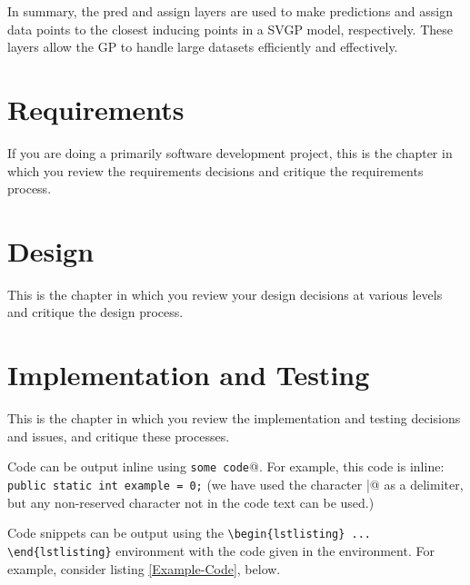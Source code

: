\documentclass[12pt,a4paper]{report}
\begin{document}
In summary, the pred and assign layers are used to make predictions and assign data points to the closest inducing points in a SVGP model, respectively. These layers allow the GP to handle large datasets efficiently and effectively.


\chapter{Requirements}

If you are doing a primarily software development project, this is the chapter in which you review the requirements decisions and critique the requirements process.

\chapter{Design}

This is the chapter in which you review your design decisions at various
levels and critique the design process.

\chapter{Implementation and Testing}

This is the chapter in which you review the implementation and testing decisions and issues, and critique these processes.

Code can be output inline using \verb@\lstinline|some code|@.  For example, this code is inline: \lstinline|public static int example = 0;| (we have used the character \verb@|@ as a delimiter, but any non-reserved character not in the code text can be used.)

Code snippets can be output using the \verb|\begin{lstlisting} ... \end{lstlisting}|
environment with the code given in the environment. For example, consider listing \ref{Example-Code}, below.
\end{document}
